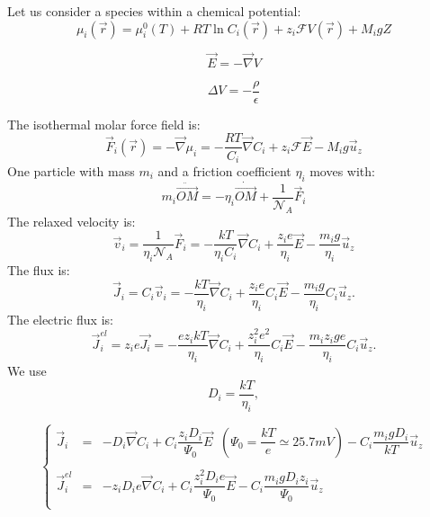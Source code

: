 \documentclass[aps,12pt]{revtex4}
\newcommand{\grad}{\vec{\nabla}}
\begin{document}
Let us consider a species within a chemical potential:
\begin{equation}
	\mu_i(\vec{r}) = \mu_i^0(T) + RT \ln C_i(\vec{r}) +  z_i \mathcal{F} V(\vec{r}) + M_i g Z
\end{equation}

\begin{equation}
	\vec{E} = -\grad V
\end{equation}

\begin{equation}
	\Delta V = -\dfrac{\rho}{\epsilon}
\end{equation}

The isothermal molar force field is:
\begin{equation}
	\vec{F}_i(\vec{r}) = -\grad \mu_{i} = -\frac{RT}{C_i} \grad C_i + z_i \mathcal{F} \vec{E} - M_i g \vec{u}_z
\end{equation}
One particle with mass $m_i$ and a friction coefficient $\eta_i$ moves with:
\begin{equation}
	m_i  \ddot{\vec{OM}} = -\eta_i  \dot{\vec{OM}} + \dfrac{1}{\mathcal{N}_A} \vec{F}_i
\end{equation}
The relaxed velocity is:
\begin{equation}
	\vec{v}_i = \dfrac{1}{\eta_i\mathcal{N}_A} \vec{F}_i = -\dfrac{kT}{\eta_i C_i} \grad C_i + \frac{z_i e}{\eta_i} \vec{E} - \dfrac{m_ig}{\eta_i} \vec{u}_z
\end{equation}
The flux is:
\begin{equation}
	\vec{J}_i = C_i \vec{v}_i = -\dfrac{kT}{\eta_i} \grad C_i + \dfrac{z_i e}{\eta_i} C_i \vec{E} - \dfrac{m_ig}{\eta_i} C_i \vec{u}_z.
\end{equation}
The electric flux is:
\begin{equation}
	\vec{J}^{el}_i = z_i e \vec{J_i} = -\dfrac{ez_ikT}{\eta_i} \grad C_i + \dfrac{z_i^2 e^2}{\eta_i} C_i \vec{E}- \dfrac{m_iz_ige}{\eta_i} C_i \vec{u}_z.
\end{equation}
We use
\begin{equation}
	D_i = \dfrac{kT}{\eta_i}, 
\end{equation}

\begin{equation}
\left\lbrace
\begin{array}{rcl}
\vec{J}_i & = &  -D_i \grad C_i + C_i \dfrac{z_i D_i}{\Psi_0}  \vec{E} \;\; (\Psi_0=\dfrac{kT}{e}\simeq 25.7 mV) - C_i \dfrac{m_ig D_i}{kT} \vec{u}_z\\
\\
\vec{J}^{el}_i & = & - z_i D_i e  \grad C_i + C_i \dfrac{z_i^2 D_i e}{\Psi_0}  \vec{E} - C_i \dfrac{m_ig D_i z_i  }{\Psi_0} \vec{u}_z \\
\end{array}
\right.
\end{equation}
\end{document}
